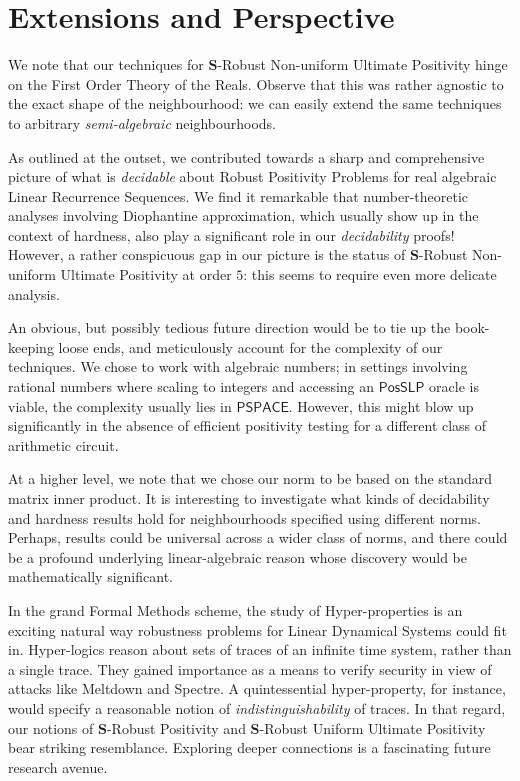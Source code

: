 \section{Extensions and Perspective}
We note that our techniques for $\mathbf{S}$-Robust Non-uniform Ultimate Positivity hinge on the First Order Theory of the Reals. Observe that this was rather agnostic to the exact shape of the neighbourhood: we can easily extend the same techniques to arbitrary \textit{semi-algebraic} neighbourhoods. 

As outlined at the outset, we contributed towards a sharp and comprehensive picture of what is \textit{decidable} about Robust Positivity Problems for real algebraic Linear Recurrence Sequences. We find it remarkable that number-theoretic analyses involving Diophantine approximation, which usually show up in the context of hardness, also play a significant role in our \textit{decidability} proofs! However, a rather conspicuous gap in our picture is the status of $\mathbf{S}$-Robust Non-uniform Ultimate Positivity at order $5$: this seems to require even more delicate analysis. 

An obvious, but possibly tedious future direction would be to tie up the book-keeping loose ends, and meticulously account for the complexity of our techniques. We chose to work with algebraic numbers; in settings involving rational numbers where scaling to integers and accessing an $\mathsf{PosSLP}$ oracle is viable, the complexity usually lies in $\mathsf{PSPACE}$. However, this might blow up significantly in the absence of efficient positivity testing for a different class of arithmetic circuit.

At a higher level, we note that we chose our norm to be based on the standard matrix inner product. It is interesting to investigate what kinds of decidability and hardness results hold for neighbourhoods specified using different norms. Perhaps, results could be universal across a wider class of norms, and there could be a profound underlying linear-algebraic reason whose discovery would be mathematically significant.

In the grand Formal Methods scheme, the study of Hyper-properties \cite{hyperproperties} is an exciting natural way robustness problems for Linear Dynamical Systems could fit in. Hyper-logics reason about sets of traces of an infinite time system, rather than a single trace. They gained importance as a means to verify security in view of attacks like Meltdown and Spectre. A quintessential hyper-property, for instance, would specify a reasonable notion of \textit{indistinguishability} of traces. In that regard, our notions of $\mathbf{S}$-Robust Positivity and $\mathbf{S}$-Robust Uniform Ultimate Positivity bear striking resemblance. Exploring deeper connections is a fascinating future research avenue.
